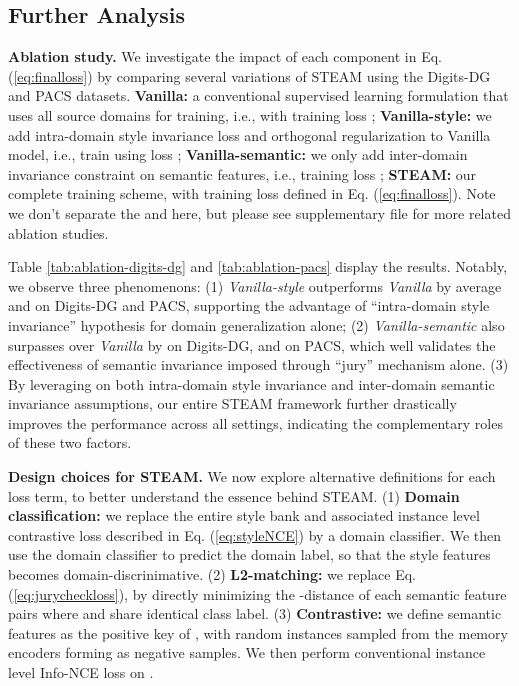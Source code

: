 \documentclass[10pt,twocolumn,letterpaper]{article}
\newcommand{\0}{{\bf 0}}
\begin{document}
\subsection{Further Analysis}
\textbf{Ablation study.} We investigate the impact of each component in Eq. (\ref{eq:finalloss}) by comparing several variations of STEAM using the Digits-DG and PACS datasets. \textbf{Vanilla:} a conventional supervised learning formulation that uses all source domains for training, i.e., with training loss ; \textbf{Vanilla-style:} we add intra-domain style invariance loss and orthogonal regularization to Vanilla model, i.e., train using loss ; \textbf{Vanilla-semantic:} we only add inter-domain invariance constraint on semantic features, i.e., training loss ; \textbf{STEAM:} our complete training scheme, with training loss defined in Eq. (\ref{eq:finalloss}). Note we don't separate the  and   here, but please see supplementary file for more related ablation studies.

Table \ref{tab:ablation-digits-dg} and \ref{tab:ablation-pacs} display the results. Notably, we observe three phenomenons: (1) \emph{Vanilla-style} outperforms \emph{Vanilla} by average  and  on Digits-DG and PACS, supporting the advantage of ``intra-domain style invariance'' hypothesis for domain generalization alone; (2) \emph{Vanilla-semantic} also surpasses over \emph{Vanilla} by  on Digits-DG, and  on PACS, which well validates the effectiveness of semantic invariance imposed through ``jury'' mechanism alone. (3) By leveraging on both intra-domain style invariance and inter-domain semantic invariance assumptions, our entire STEAM framework further drastically improves the performance across all settings, indicating the complementary roles of these two factors.

\textbf{Design choices for STEAM.} We now explore alternative definitions for each loss term, to better understand the essence behind STEAM. (1) \textbf{Domain classification:} we replace the entire style bank and associated instance level contrastive loss described in Eq. (\ref{eq:styleNCE}) by a domain classifier. We then use the domain classifier to predict the domain label, so that the style features becomes domain-discrinimative. (2) \textbf{L2-matching:} we replace Eq. (\ref{eq:jurycheckloss}), by directly minimizing the -distance of each semantic feature pairs  where  and  share identical class label. (3) \textbf{Contrastive:} we define semantic features  as the positive key of , with random instances sampled from the memory encoders forming   as negative samples. We then perform conventional instance level Info-NCE loss on .
\end{document}
